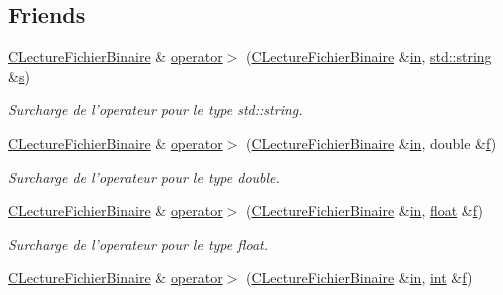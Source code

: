 \subsection*{Friends}
\begin{DoxyCompactItemize}
\item 
\hyperlink{class_c_lecture_fichier_binaire}{C\-Lecture\-Fichier\-Binaire} \& \hyperlink{class_c_lecture_fichier_binaire_abc9f4d65dcf682dbf572f5110a00252d}{operator$>$} (\hyperlink{class_c_lecture_fichier_binaire}{C\-Lecture\-Fichier\-Binaire} \&\hyperlink{glew_8h_a83ad0ee7f1e06b59c90271716e689080}{in}, \hyperlink{glew_8h_ae84541b4f3d8e1ea24ec0f466a8c568b}{std\-::string} \&\hyperlink{glew_8h_a4af680a6c683f88ed67b76f207f2e6e4}{s})
\begin{DoxyCompactList}\small\item\em Surcharge de l'operateur pour le type {\itshape std\-::string}. \end{DoxyCompactList}\item 
\hyperlink{class_c_lecture_fichier_binaire}{C\-Lecture\-Fichier\-Binaire} \& \hyperlink{class_c_lecture_fichier_binaire_a8b4123b210cccf9da0d2eb60dc19b8a0}{operator$>$} (\hyperlink{class_c_lecture_fichier_binaire}{C\-Lecture\-Fichier\-Binaire} \&\hyperlink{glew_8h_a83ad0ee7f1e06b59c90271716e689080}{in}, double \&\hyperlink{glew_8h_a691492ec0bd6383f91200e49f6ae40ed}{f})
\begin{DoxyCompactList}\small\item\em Surcharge de l'operateur pour le type {\itshape double}. \end{DoxyCompactList}\item 
\hyperlink{class_c_lecture_fichier_binaire}{C\-Lecture\-Fichier\-Binaire} \& \hyperlink{class_c_lecture_fichier_binaire_a8727572665715de99f2908c711e45114}{operator$>$} (\hyperlink{class_c_lecture_fichier_binaire}{C\-Lecture\-Fichier\-Binaire} \&\hyperlink{glew_8h_a83ad0ee7f1e06b59c90271716e689080}{in}, \hyperlink{fmod_8h_aeb841aa4b4b5f444b5d739d865b420af}{float} \&\hyperlink{glew_8h_a691492ec0bd6383f91200e49f6ae40ed}{f})
\begin{DoxyCompactList}\small\item\em Surcharge de l'operateur pour le type {\itshape float}. \end{DoxyCompactList}\item 
\hyperlink{class_c_lecture_fichier_binaire}{C\-Lecture\-Fichier\-Binaire} \& \hyperlink{class_c_lecture_fichier_binaire_a327898e8bcb11d00bdb07e3e8bd361bd}{operator$>$} (\hyperlink{class_c_lecture_fichier_binaire}{C\-Lecture\-Fichier\-Binaire} \&\hyperlink{glew_8h_a83ad0ee7f1e06b59c90271716e689080}{in}, \hyperlink{wglew_8h_a500a82aecba06f4550f6849b8099ca21}{int} \&\hyperlink{glew_8h_a691492ec0bd6383f91200e49f6ae40ed}{f})

\end{DoxyCompactItemize}

